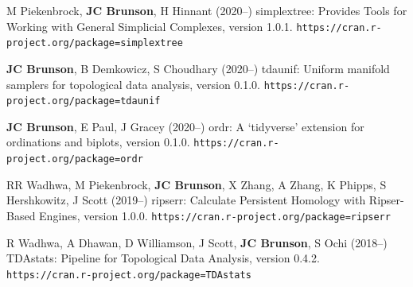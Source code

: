 \documentclass[10pt,a4paper]{article}
\begin{document}
\begin{enumerate}[label={[\arabic*]},labelindent=1cm,nolistsep]
\item
M Piekenbrock, {\bfseries JC Brunson}, H Hinnant (2020--) {\sffamily simplextree}: Provides Tools for Working with General Simplicial Complexes, version 1.0.1. {\tt\small\nolinkurl{https://cran.r-project.org/package=simplextree}}
\item
{\bfseries JC Brunson}, B Demkowicz, S Choudhary (2020--) {\sffamily tdaunif}: Uniform manifold samplers for topological data analysis, version 0.1.0. {\tt\small\nolinkurl{https://cran.r-project.org/package=tdaunif}}
\item
{\bfseries JC Brunson}, E Paul, J Gracey (2020--) {\sffamily ordr}: A `tidyverse' extension for ordinations and biplots, version 0.1.0. {\tt\small\nolinkurl{https://cran.r-project.org/package=ordr}}
\item
RR Wadhwa, M Piekenbrock, {\bfseries JC Brunson}, X Zhang, A Zhang, K Phipps, S Hershkowitz, J Scott (2019--) {\sffamily ripserr}: Calculate Persistent Homology with Ripser-Based Engines, version 1.0.0. {\tt\small\nolinkurl{https://cran.r-project.org/package=ripserr}}
\item
R Wadhwa, A Dhawan, D Williamson, J Scott, {\bfseries JC Brunson}, S Ochi (2018--) {\sffamily TDAstats}: Pipeline for Topological Data Analysis, version 0.4.2. {\tt\small\nolinkurl{https://cran.r-project.org/package=TDAstats}}
\setcounter{paper}{\value{enumi}}
\end{enumerate}
\end{document}
